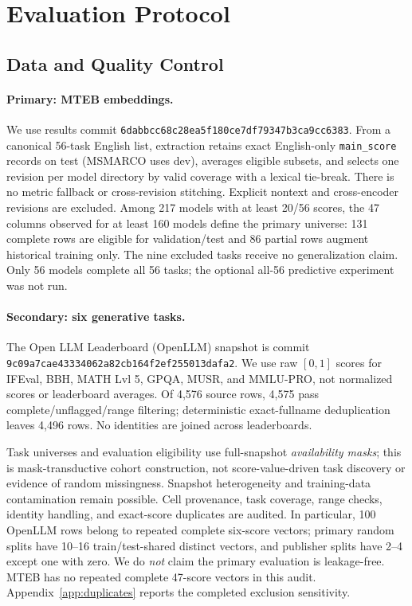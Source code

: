 \documentclass{article}
\begin{document}
\section{Evaluation Protocol}
\label{sec:protocol}
\subsection{Data and Quality Control}
\paragraph{Primary: MTEB embeddings.}
We use results commit \texttt{6dabbcc68c28ea5f180c\allowbreak e7df79347b3ca9cc6383}. From a canonical 56-task English list, extraction retains exact English-only \texttt{main\_score} records on test (MSMARCO uses dev), averages eligible subsets, and selects one revision per model directory by valid coverage with a lexical tie-break. There is no metric fallback or cross-revision stitching. Explicit nontext and cross-encoder revisions are excluded. Among 217 models with at least 20/56 scores, the 47 columns observed for at least 160 models define the primary universe: 131 complete rows are eligible for validation/test and 86 partial rows augment historical training only. The nine excluded tasks receive no generalization claim. Only 56 models complete all 56 tasks; the optional all-56 predictive experiment was not run.

\paragraph{Secondary: six generative tasks.}
The Open LLM Leaderboard (OpenLLM) snapshot is commit \texttt{9c09a7cae43334062a82\allowbreak cb164f2ef255013dafa2}. We use raw $[0,1]$ scores for IFEval, BBH, MATH Lvl 5, GPQA, MUSR, and MMLU-PRO, not normalized scores or leaderboard averages. Of 4,576 source rows, 4,575 pass complete/unflagged/range filtering; deterministic exact-fullname deduplication leaves 4,496 rows. No identities are joined across leaderboards.

Task universes and evaluation eligibility use full-snapshot \emph{availability masks}; this is mask-transductive cohort construction, not score-value-driven task discovery or evidence of random missingness. Snapshot heterogeneity and training-data contamination remain possible. Cell provenance, task coverage, range checks, identity handling, and exact-score duplicates are audited. In particular, 100 OpenLLM rows belong to repeated complete six-score vectors; primary random splits have 10--16 train/test-shared distinct vectors, and publisher splits have 2--4 except one with zero. We do \emph{not} claim the primary evaluation is leakage-free. MTEB has no repeated complete 47-score vectors in this audit. Appendix~\ref{app:duplicates} reports the completed exclusion sensitivity.
\end{document}
